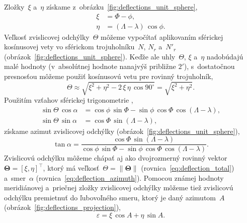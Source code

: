 \documentclass[a4paper, 12pt]{book}
\begin{document}
Zložky~$\xi$ a~$\eta$ získame z~obrázku~\ref{fig:deflections_unit_sphere},
%
\begin{equation}
\begin{split}
\xi  &= \Phi - \phi{,}\\
\eta &= (\Lambda - \lambda) \, \cos\phi{.}
\end{split}
\end{equation}
%
Veľkosť zvislicovej odchýlky~$\Theta$ môžeme vypočítať aplikovaním sférickej 
kosínusovej vety vo sférickom trojuholníku~$N$, $N_r$ a~$N'_r$ 
(obrázok~\ref{fig:deflections_unit_sphere}).  Keďže ale uhly~$\Theta$, $\xi$ 
a~$\eta$ nadobúdajú malé hodnoty (v~absolútnej hodnote nanajvýš približne 
$2'$), s~dostatočnou presnosťou môžeme použiť kosínusovú vetu pre rovinný 
trojuholník,
%
\begin{equation}
\label{eq:deflection_total}
\Theta \approx \sqrt{\xi^2 + \eta^2 - 2\, \xi \, \eta \, \cos 90^{\circ}} 
= \sqrt{\xi^2 + \eta^2}{.}
\end{equation}
%
Použitím vzťahov sférickej trigonometrie 
\parencite[napríklad][]{MoritzPhysicalGeodesy},
%
\begin{equation}
\label{eq:deflection_aux}
\begin{split}
\sin\Theta \, \cos\alpha &= \cos\phi \, \sin\Phi - \sin\phi \, \cos\Phi \, 
\cos(\Lambda - \lambda){,}\\
\sin\Theta \, \sin\alpha &= \cos\Phi \, \sin(\Lambda - \lambda),
\end{split}
\end{equation}
%
získame azimut zvislicovej odchýlky 
(obrázok~\ref{fig:deflections_unit_sphere}),
%
\begin{equation}
\label{eq:deflection_azimuth}
\tan\alpha = \frac{\cos\Phi \, \sin(\Lambda - \lambda)}{\cos\phi \, \sin\Phi 
- \sin\phi \, \cos\Phi \, \cos(\Lambda - \lambda)}{.}
\end{equation}
%
Zvislicovú odchýlku môžeme chápať aj ako dvojrozmerný rovinný 
vektor~$\boldsymbol\Theta = [\xi, \eta]^\top$, ktorý má veľkosť~$\Theta = \| 
\boldsymbol\Theta \|$ (rovnica~\ref{eq:deflection_total}) a~smer~$\alpha$ 
(rovnica~\ref{eq:deflection_azimuth}).  Pomocou známej hodnoty meridiánovej 
a~priečnej zložky zvislicovej odchýlky môžeme tiež zvislicovú odchýlku 
premietnuť do ľubovoľného smeru, ktorý je daný azimutom~$A$ 
(obrázok~\ref{fig:deflections_projection}),
%
\begin{equation}
\label{eq:deflection_vareps}
\varepsilon = \xi \, \cos A + \eta \, \sin A{.}
\end{equation}
\end{document}

